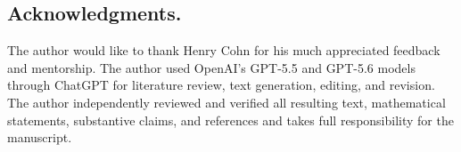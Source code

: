 \documentclass[reqno]{amsart}
\begin{document}
\vspace{1em}


\subsection*{Acknowledgments.} 
The author would like to thank Henry Cohn for his much appreciated feedback and mentorship.
The author used OpenAI's GPT-5.5 and GPT-5.6 models through ChatGPT for literature review, text generation, editing, and revision. The author independently reviewed and verified all resulting text, mathematical statements, substantive claims, and references and takes full responsibility for the manuscript.













 
 
 
\end{document}
